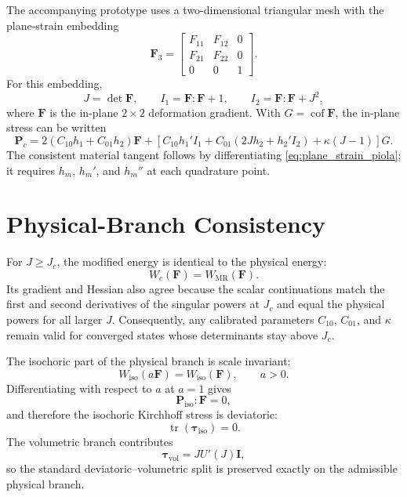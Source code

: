 \documentclass[11pt]{article}
\newcommand{\F}{\bm F}
\newcommand{\I}{\bm I}
\newcommand{\Pola}{\bm P}
\newcommand{\tauK}{\bm\tau}
\newcommand{\cof}{\operatorname{cof}}
\newcommand{\tr}{\operatorname{tr}}
\begin{document}
The accompanying prototype uses a two-dimensional triangular mesh with the
plane-strain embedding
\begin{equation}
  \F_3=
  \begin{bmatrix}
    F_{11} & F_{12} & 0\\
    F_{21} & F_{22} & 0\\
    0 & 0 & 1
  \end{bmatrix}.
\end{equation}
For this embedding,
\begin{equation}
  J=\det\F,\qquad
  I_1=\F:\F+1,\qquad
  I_2=\F:\F+J^2,
  \label{eq:plane_strain_invariants}
\end{equation}
where $\F$ is the in-plane $2\times2$ deformation gradient. With
$G=\cof\F$, the in-plane stress can be written
\begin{equation}
  \Pola_c
  =
  2(C_{10}h_1+C_{01}h_2)\F
  +
  \left[
    C_{10}h_1'I_1
    +
    C_{01}(2Jh_2+h_2'I_2)
    +
    \kappa(J-1)
  \right]G.
  \label{eq:plane_strain_piola}
\end{equation}
The consistent material tangent follows by differentiating
\eqref{eq:plane_strain_piola}; it requires $h_m$, $h_m'$, and $h_m''$ at each
quadrature point.

\section{Physical-Branch Consistency}

For $J\ge J_c$, the modified energy is identical to the physical energy:
\begin{equation}
  W_c(\F)=W_{\mathrm{MR}}(\F).
\end{equation}
Its gradient and Hessian also agree because the scalar continuations match the
first and second derivatives of the singular powers at $J_c$ and equal the
physical powers for all larger $J$. Consequently, any calibrated parameters
$C_{10}$, $C_{01}$, and $\kappa$ remain valid for converged states whose
determinants stay above $J_c$.

The isochoric part of the physical branch is scale invariant:
\begin{equation}
  W_{\mathrm{iso}}(a\F)=W_{\mathrm{iso}}(\F),\qquad a>0.
\end{equation}
Differentiating with respect to $a$ at $a=1$ gives
\begin{equation}
  \Pola_{\mathrm{iso}}:\F=0,
\end{equation}
and therefore the isochoric Kirchhoff stress is deviatoric:
\begin{equation}
  \tr(\tauK_{\mathrm{iso}})=0.
\end{equation}
The volumetric branch contributes
\begin{equation}
  \tauK_{\mathrm{vol}}=J U'(J)\I,
\end{equation}
so the standard deviatoric--volumetric split is preserved exactly on the
admissible physical branch.
\end{document}
